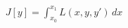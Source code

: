 \documentclass[preview]{standalone}
\begin{document}
\begin{align*}
J[y] = \int_{x_0}^{x_1} L(x, y, y') \, dx
\end{align*}
\end{document}
